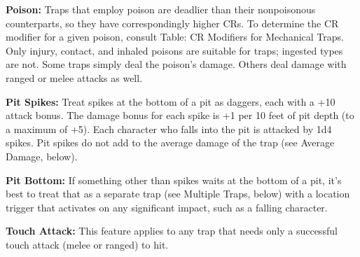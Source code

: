 \textbf{Poison:} Traps that employ poison are deadlier than their nonpoisonous counterparts, so they have correspondingly higher CRs. To determine the CR modifier for a given poison, consult Table: CR Modifiers for Mechanical Traps. Only injury, contact, and inhaled poisons are suitable for traps; ingested types are not. Some traps simply deal the poison's damage. Others deal damage with ranged or melee attacks as well.

\textbf{Pit Spikes:} Treat spikes at the bottom of a pit as daggers, each with a +10 attack bonus. The damage bonus for each spike is +1 per 10 feet of pit depth (to a maximum of +5). Each character who falls into the pit is attacked by 1d4 spikes. Pit spikes do not add to the average damage of the trap (see Average Damage, below).

\textbf{Pit Bottom:} If something other than spikes waits at the bottom of a pit, it's best to treat that as a separate trap (see Multiple Traps, below) with a location trigger that activates on any significant impact, such as a falling character.

\textbf{Touch Attack:} This feature applies to any trap that needs only a successful touch attack (melee or ranged) to hit.

